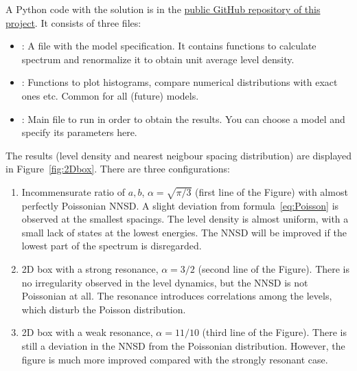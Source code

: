 \documentclass[a4paper,11pt,twoside]{article}
\begin{document}
        \begin{solution}
            A Python code with the solution is in the \href{https://github.com/PavelStransky/Chaos}{public GitHub repository of this project}.
            It consists of three files: 
            \begin{itemize}
                \item 
                    : A file with the model specification. 
                    It contains functions to calculate spectrum and renormalize it to obtain unit average level density.
                \item
                    : Functions to plot histograms, compare numerical distributions with exact ones etc.
                    Common for all (future) models.
                \item
                    : Main file to run in order to obtain the results.
                    You can choose a model and specify its parameters here.
            \end{itemize}
            The results (level density and nearest neigbour spacing distribution) are displayed in Figure~\ref{fig:2Dbox}.
            There are three configurations:
            \begin{enumerate}
                \item 
                    Incommensurate ratio of $a,b$, $\alpha=\sqrt{\pi/3}$ (first line of the Figure) with almost perfectly Poissonian NNSD. 
                    A slight deviation from formula~\eqref{eq:Poisson} is observed at the smallest spacings.
                    The level density is almost uniform, with a small lack of states at the lowest energies.
                    The NNSD will be improved if the lowest part of the spectrum is disregarded.
                \item
                    2D box with a strong resonance, $\alpha=3/2$ (second line of the Figure).
                    There is no irregularity observed in the level dynamics, but the NNSD is not Poissonian at all.
                    The resonance introduces correlations among the levels, which disturb the Poisson distribution.
                \item
                    2D box with a weak resonance, $\alpha=11/10$ (third line of the Figure).
                    There is still a deviation in the NNSD from the Poissonian distribution.
                    However, the figure is much more improved compared with the strongly resonant case. 
            \end{enumerate}


\end{solution}
\end{document}
